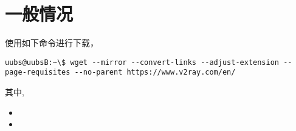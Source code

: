 \documentclass{article}
\begin{document}
\section{一般情况}
使用如下命令进行下载，
\begin{lstlisting}
uubs@uubsB:~\$ wget --mirror --convert-links --adjust-extension --page-requisites --no-parent https://www.v2ray.com/en/
\end{lstlisting}

其中,
\begin{itemize}
    \item
    \item
\end{itemize}
\end{document}
